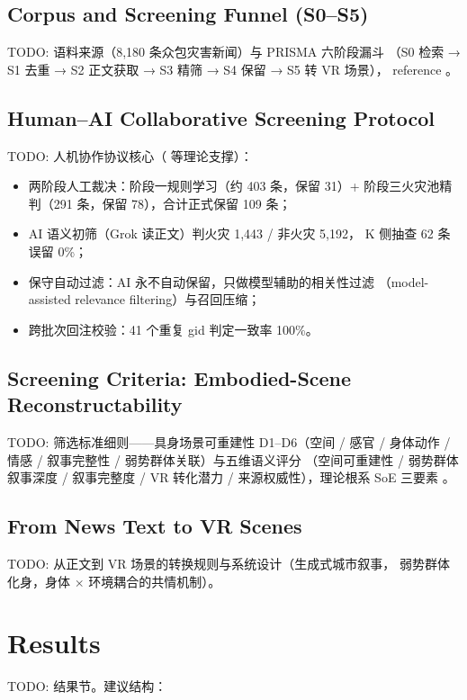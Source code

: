 \documentclass[manuscript,review,anonymous]{acmart}
\begin{document}
\subsection{Corpus and Screening Funnel (S0--S5)}
TODO: 语料来源（8,180 条众包灾害新闻）与 PRISMA 六阶段漏斗
（S0 检索 → S1 去重 → S2 正文获取 → S3 精筛 → S4 保留 → S5 转 VR 场景），
reference \cite{page2021prisma}。

\subsection{Human--AI Collaborative Screening Protocol}
TODO: 人机协作协议核心（\cite{delapena2010immersive} 等理论支撑）：
\begin{itemize}
  \item 两阶段人工裁决：阶段一规则学习（约 403 条，保留 31）+
        阶段三火灾池精判（291 条，保留 78），合计正式保留 109 条；
  \item AI 语义初筛（Grok 读正文）判火灾 1,443 / 非火灾 5,192，
        K 侧抽查 62 条误留 0\%；
  \item 保守自动过滤：AI 永不自动保留，只做模型辅助的相关性过滤
        （model-assisted relevance filtering）与召回压缩；
  \item 跨批次回注校验：41 个重复 gid 判定一致率 100\%。
\end{itemize}

\subsection{Screening Criteria: Embodied-Scene Reconstructability}
TODO: 筛选标准细则——具身场景可重建性 D1--D6（空间 / 感官 /
身体动作 / 情感 / 叙事完整性 / 弱势群体关联）与五维语义评分
（空间可重建性 / 弱势群体叙事深度 / 叙事完整度 / VR 转化潜力 /
来源权威性），理论根系 SoE 三要素 \cite{kilteni2012embodiment}。

\subsection{From News Text to VR Scenes}
TODO: 从正文到 VR 场景的转换规则与系统设计（生成式城市叙事，
弱势群体化身，身体 $\times$ 环境耦合的共情机制）。

\section{Results}
\label{sec:results}
TODO: 结果节。建议结构：
\end{document}
